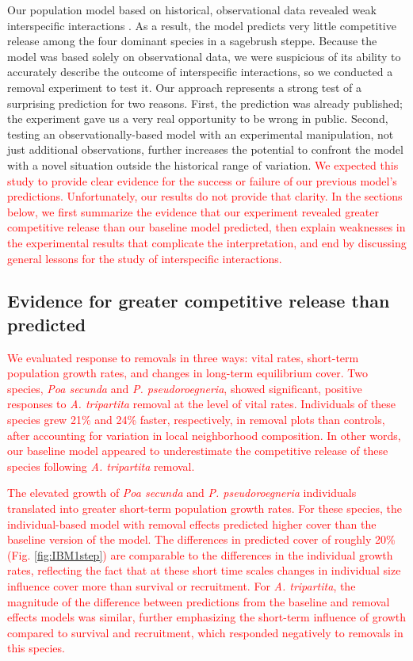 \documentclass[11pt]{article}
\newcommand{\new}{\textcolor{red}}
\begin{document}
\begin{doublespacing}
Our population model based on historical, observational data revealed weak interspecific interactions \citep{adler_coexistence_2010,chu_large_2015}. As a result, the model predicts very little competitive release among the four dominant species in a sagebrush steppe. 
Because the model was based solely on observational
data, we were suspicious of its ability to accurately describe the outcome of interspecific interactions, so we conducted a removal experiment to test it. 
Our approach represents a strong test of a surprising prediction for two reasons. First, the prediction was already published; the experiment 
gave us a very real opportunity to be wrong in public. Second, testing an observationally-based model with an experimental manipulation, 
not just additional observations, further increases the potential to confront the model with a novel situation outside the historical range of variation.
\new{We expected this study to provide clear evidence for the success or failure of our previous model's predictions. Unfortunately, our results do not provide that clarity. In the sections below, we first summarize the evidence that our experiment revealed greater competitive release than our baseline model predicted, then explain weaknesses in the experimental results that complicate the interpretation, and end by discussing general lessons for the study of interspecific interactions.}

\subsection*{Evidence for greater competitive release than predicted}

\new{We evaluated response to removals in three ways: vital rates, short-term population growth rates, and changes in long-term equilibrium cover. Two species, \textit{Poa secunda} and \textit{P. pseudoroegneria}, showed significant, positive responses to \textit{A. tripartita} removal at the level of vital rates. Individuals of these species grew 21\% and 24\% faster, respectively, in removal plots than controls, after accounting for variation in local neighborhood composition. In other words, our baseline model appeared to underestimate the competitive release of these species following \textit{A. tripartita} removal.}

\new{The elevated growth of \textit{Poa secunda} and \textit{P. pseudoroegneria} individuals translated into greater short-term population growth rates. For these species, the individual-based model with removal effects predicted higher cover than the baseline version of the model. The differences in predicted cover of roughly 20\% (Fig. \ref{fig:IBM1step}) are comparable to the differences in the individual growth rates, reflecting the fact that at these short time scales changes in individual size influence cover more than survival or recruitment.  For \textit{A. tripartita}, the magnitude of the difference between predictions from the baseline and removal effects models was similar, further emphasizing the short-term influence of growth compared to survival and recruitment, which responded negatively to removals in this species.   }


\end{doublespacing}
\end{document}
